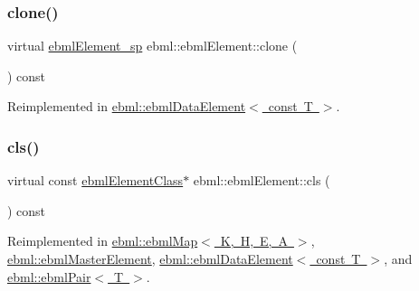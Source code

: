 \mbox{\label{classebml_1_1ebmlElement_a94013f01b6f12c9c66864d44983dce47}} 
\subsubsection{\texorpdfstring{clone()}{clone()}}
{\footnotesize\ttfamily virtual \mbox{\hyperlink{namespaceebml_adad533b7705a16bb360fe56380c5e7be}{ebml\+Element\+\_\+sp}} ebml\+::ebml\+Element\+::clone (\begin{DoxyParamCaption}{ }\end{DoxyParamCaption}) const\hspace{0.3cm}{\ttfamily [virtual]}}



Reimplemented in \mbox{\hyperlink{classebml_1_1ebmlDataElement_3_01const_01T_01_4_a23f7032682dfdf20ce042caf144e50d6}{ebml\+::ebml\+Data\+Element$<$ const T $>$}}.

\mbox{\label{classebml_1_1ebmlElement_a15cf59e94b01e2c49ec96512b9bd9d90}} 
\subsubsection{\texorpdfstring{cls()}{cls()}}
{\footnotesize\ttfamily virtual const \mbox{\hyperlink{classebml_1_1ebmlElementClass}{ebml\+Element\+Class}}$\ast$ ebml\+::ebml\+Element\+::cls (\begin{DoxyParamCaption}{ }\end{DoxyParamCaption}) const\hspace{0.3cm}{\ttfamily [virtual]}}



Reimplemented in \mbox{\hyperlink{classebml_1_1ebmlMap_a44f835be40d70d8425b8e08fbe0ce77f}{ebml\+::ebml\+Map$<$ K, H, E, A $>$}}, \mbox{\hyperlink{classebml_1_1ebmlMasterElement_a4073fb3f7ce3dda153384821714df29e}{ebml\+::ebml\+Master\+Element}}, \mbox{\hyperlink{classebml_1_1ebmlDataElement_3_01const_01T_01_4_a27173a9d7784ce0cfca71e1c72c36ec7}{ebml\+::ebml\+Data\+Element$<$ const T $>$}}, and \mbox{\hyperlink{classebml_1_1ebmlPair_ad1244458e1390cbf567dfd460b0002f2}{ebml\+::ebml\+Pair$<$ T $>$}}.

